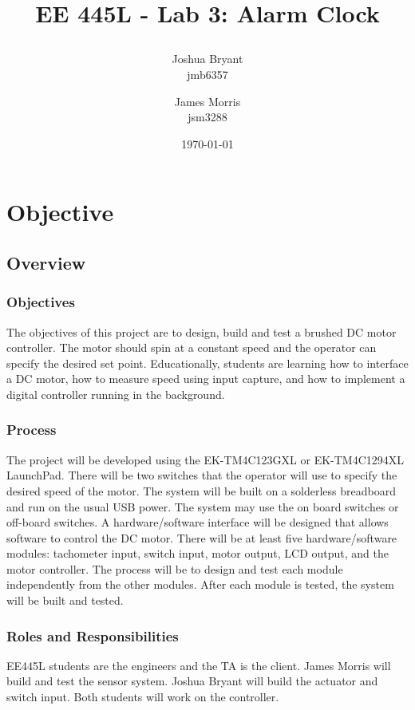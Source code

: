 \documentclass{article}
\title{\begin{LARGE}
	\textbf{EE 445L - Lab 3: Alarm Clock}
\end{LARGE}} %
\author{Joshua Bryant \\ jmb6357 \and James Morris \\ jsm3288} %
\date{\today} %
\begin{document}
\maketitle %


\section{Objective}
	\subsection{Overview}
		\subsubsection{Objectives}
			The objectives of this project are to design, build and test a brushed DC motor controller. The motor should spin at a constant speed and the operator can specify the desired set point. Educationally, students are learning how to interface a DC motor, how to measure speed using input capture, and how to implement a digital controller running in the background.
		\subsubsection{Process}
			The project will be developed using the EK-TM4C123GXL or EK-TM4C1294XL LaunchPad. There will be two switches that the operator will use to specify  the desired speed of the motor. The system will be built on a solderless breadboard and run on the usual USB power. The system may use the on board switches or off-board switches. A hardware/software interface will be designed that allows software to control the DC motor. There will be at least five hardware/software modules: tachometer input, switch input, motor output, LCD output, and the motor controller. The process will be to design and test each module independently from the other modules. After each module is tested, the system will be built and tested.
		\subsubsection{Roles and Responsibilities}
			EE445L students are the engineers and the TA is the client. James Morris will build and test the sensor system. Joshua Bryant will build the actuator and switch input. Both students will work on the controller.
\end{document}
